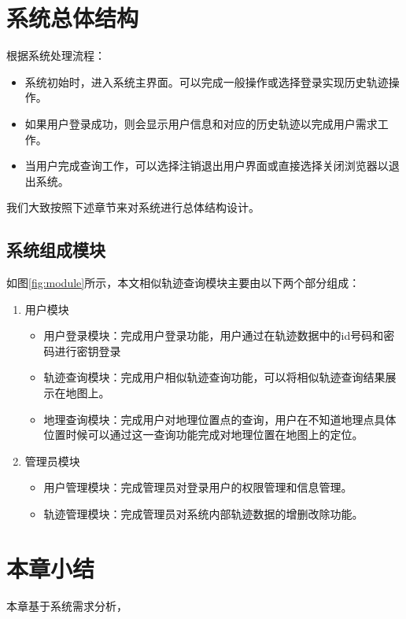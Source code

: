 
\section{系统总体结构}
\label{sec:system analysis}
根据系统处理流程：
\begin{itemize}
	\item 系统初始时，进入系统主界面。可以完成一般操作或选择登录实现历史轨迹操作。
	\item 如果用户登录成功，则会显示用户信息和对应的历史轨迹以完成用户需求工作。
	\item 当用户完成查询工作，可以选择注销退出用户界面或直接选择关闭浏览器以退出系统。
\end{itemize}

我们大致按照下述章节来对系统进行总体结构设计。

\subsection{系统组成模块}
\label{subsec:component analysis}
\begin{figure}[!htp]
    \centering
    \resizebox{!}{!}{}
\end{figure}

如图\ref{fig:module}所示，本文相似轨迹查询模块主要由以下两个部分组成：
\begin{enumerate}
	\item 用户模块
	\begin{itemize}
		\item 用户登录模块：完成用户登录功能，用户通过在轨迹数据中的id号码和密码进行密钥登录
		\item 轨迹查询模块：完成用户相似轨迹查询功能，可以将相似轨迹查询结果展示在地图上。
		\item 地理查询模块：完成用户对地理位置点的查询，用户在不知道地理点具体位置时候可以通过这一查询功能完成对地理位置在地图上的定位。
	\end{itemize}
	\item 管理员模块
	\begin{itemize}
		\item 用户管理模块：完成管理员对登录用户的权限管理和信息管理。
		\item 轨迹管理模块：完成管理员对系统内部轨迹数据的增删改除功能。
	\end{itemize}
\end{enumerate}


\section{本章小结}
\label{sec:design conclusion}
本章基于系统需求分析，
